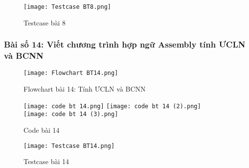 \begin{figure}[H]
    \centering
    \texttt{[image: Testcase BT8.png]}
    \caption{Testcase bài 8}
    \label{fig:testcase_bt8}
\end{figure}


\subsubsection*{Bài số 14: Viết chương trình hợp ngữ Assembly tính ƯCLN và BCNN}

\begin{figure}[H]
    \centering
    \texttt{[image: Flowchart BT14.png]}
    \caption{Flowchart bài 14: Tính ƯCLN và BCNN}
    \label{fig:flowchart_bt14}
\end{figure}

\begin{figure}[H]
    \centering
    \texttt{[image: code bt 14.png]}
    \texttt{[image: code bt 14 (2).png]}\\
    \texttt{[image: code bt 14 (3).png]}
    \caption{Code bài 14}
    \label{fig:code_bt14}
\end{figure}

\begin{figure}[H]
    \centering
    \texttt{[image: Testcase BT14.png]}
    \caption{Testcase bài 14}
    \label{fig:testcase_bt14}
\end{figure}

